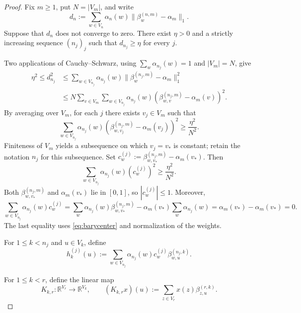 \documentclass[11pt]{amsart}
\theoremstyle{definition}
\theoremstyle{remark}
\begin{document}
\begin{proof}
Fix $m\geq1$, put $N=|V_m|$, and write
\[
 d_n:=\sum_{w\in V_n}\alpha_n(w)
       \|\beta_w^{(n,m)}-\alpha_m\|_1.
\]
Suppose that $d_n$ does not converge to zero.
There exist $\eta>0$ and a strictly increasing sequence $(n_j)_j$ such that
$d_{n_j}\geq\eta$ for every $j$.

Two applications of Cauchy--Schwarz, using
$\sum_w\alpha_{n_j}(w)=1$ and $|V_m|=N$, give
\[
 \begin{aligned}
 \eta^2\leq d_{n_j}^2
 &\leq\sum_{w\in V_{n_j}}\alpha_{n_j}(w)
       \|\beta_w^{(n_j,m)}-\alpha_m\|_1^2\\
 &\leq N\sum_{v\in V_m}\sum_{w\in V_{n_j}}\alpha_{n_j}(w)
       (\beta_{w,v}^{(n_j,m)}-\alpha_m(v))^2.
 \end{aligned}
\]
By averaging over $V_m$, for each $j$ there exists
$v_j\in V_m$ such that
\[
 \sum_{w\in V_{n_j}}\alpha_{n_j}(w)
       (\beta_{w,v_j}^{(n_j,m)}-\alpha_m(v_j))^2
 \geq\frac{\eta^2}{N^2}.
\]
Finiteness of $V_m$ yields a subsequence on which $v_j=v_*$ is constant;
retain the notation $n_j$ for this subsequence.
Set $c_w^{(j)}:=\beta_{w,v_*}^{(n_j,m)}-\alpha_m(v_*)$.  Then
\begin{equation}\label{eq:positive-barycentric-variance}
 \sum_{w\in V_{n_j}}\alpha_{n_j}(w)(c_w^{(j)})^2
 \geq\frac{\eta^2}{N^2}.
\end{equation}
Both $\beta_{w,v_*}^{(n_j,m)}$ and $\alpha_m(v_*)$ lie in $[0,1]$, so
$|c_w^{(j)}|\leq1$.  Moreover,
\begin{equation}\label{eq:centered-barycentric-coefficients}
 \sum_{w\in V_{n_j}}\alpha_{n_j}(w)c_w^{(j)}
 =\sum_w\alpha_{n_j}(w)\beta_{w,v_*}^{(n_j,m)}
   -\alpha_m(v_*)\sum_w\alpha_{n_j}(w)
 =\alpha_m(v_*)-\alpha_m(v_*)=0.
\end{equation}
The last equality uses \eqref{eq:barycenter} and normalization of the weights.

For $1\leq k<n_j$ and $u\in V_k$, define
\begin{equation}\label{eq:finite-coherent-perturbation}
 h_k^{(j)}(u):=\sum_{w\in V_{n_j}}
       \alpha_{n_j}(w)c_w^{(j)}\beta_{w,u}^{(n_j,k)}.
\end{equation}

For $1\leq k<r$, define the linear map
\[
 K_{k,r}\colon\mathbb R^{V_r}\longrightarrow\mathbb R^{V_k},
 \qquad
 (K_{k,r}x)(u)
 :=\sum_{z\in V_r}x(z)\beta_{z,u}^{(r,k)}.
\]


\end{proof}
\end{document}
